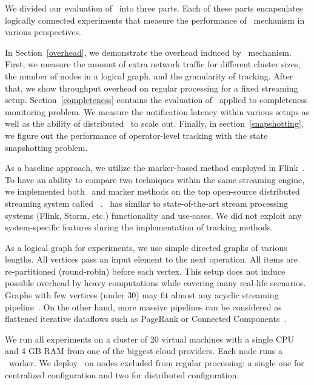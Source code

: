 \label {fs-acker-experiments}

We divided our evaluation of \tracker\ into three parts. Each of these parts encapsulates logically connected experiments that measure the performance of \tracker\ mechanism in various perspectives.

In Section~\ref{overhead}, we demonstrate the overhead induced by \tracker\ mechanism. First, we measure the amount of extra network traffic for different cluster sizes, the number of nodes in a logical graph, and the granularity of tracking. After that, we show throughput overhead on regular processing for a fixed streaming setup. Section~\ref{completeness} contains the evaluation of \tracker\ applied to completeness monitoring problem. We measure the notification latency within various setups as well as the ability of distributed \tracker\ to scale out. Finally, in section~\ref{snapshotting}, we figure out the performance of operator-level tracking with the state snapshotting problem. 

As a baseline approach, we utilize the marker-based method employed in Flink~\cite{Carbone:2017:SMA:3137765.3137777}. To have an ability to compare two techniques within the same streaming engine, we implemented both \tracker\ and marker methods on the top open-source distributed streaming system called \FlameStream\ . \FlameStream\ has similar to state-of-the-art stream processing systems (Flink, Storm, etc.) functionality and use-cases. We did not exploit any system-specific features during the implementation of tracking methods.

As a logical graph for experiments, we use simple directed graphs of various lengths. All vertices pass an input element to the next operation. All items are re-partitioned (round-robin) before each vertex. This setup does not induce possible overhead by heavy computations while covering many real-life scenarios. Graphs with few vertices (under 30) may fit almost any acyclic streaming pipeline~\cite{akidau2018streaming}. On the other hand, more massive pipelines can be considered as flattened iterative dataflows such as PageRank or Connected Components~\cite{Murray:2013:NTD:2517349.2522738, xu2016efficient}. 

We run all experiments on a cluster of 20 virtual machines with a single CPU and 4 GB RAM from one of the biggest cloud providers. Each node runs a \FlameStream\ worker. We deploy \tracker\ on nodes excluded from regular processing: a single one for centralized configuration and two for distributed configuration.

